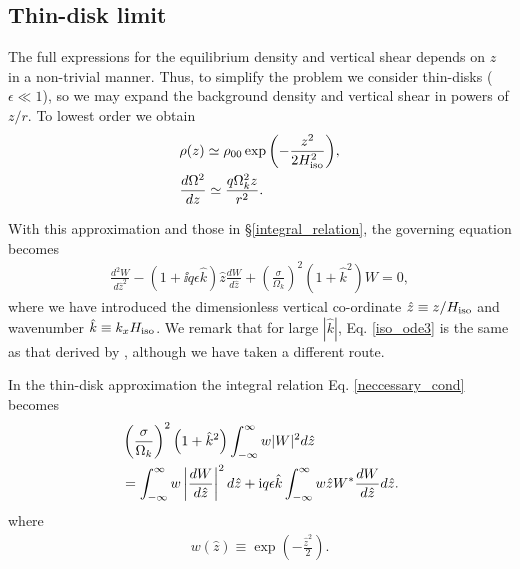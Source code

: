 \subsection{Thin-disk limit}
The full expressions for the equilibrium density and vertical shear
depends on $z$ in a non-trivial manner. Thus, to simplify the problem 
we consider thin-disks ($\epsilon\ll1$), 
so we may expand the background density and vertical shear in powers
of $z/r$. To lowest order we obtain
\begin{align}
  &\rho(z) \simeq \rho_{00} \exp{\left(-\frac{z^2}{2H_\mathrm{iso}^2}\right)},\label{thin_dens}\\
  &\frac{d\Omega^2}{dz} \simeq \frac{q\Omega_k^2z}{r^2}. \label{thin_vshear}
\end{align}


With this approximation and those in \S\ref{integral_relation}, the
governing equation becomes
\begin{align}\label{iso_ode3}
  \frac{d^2W}{d\hat{z}^2} - \left(1 + \ii q\epsilon
    \hat{k}\right)\hat{z}\frac{dW}{d\hat{z}} +
  \left(\frac{\sigma}{\Omega_k}\right)^2\left(1+\hat{k}^2\right)W = 
  0, 
\end{align}
where we have introduced the dimensionless vertical co-ordinate
$\hat{z} \equiv z/H_\mathrm{iso}$ and wavenumber $\hat{k} \equiv k_x H_\mathrm{iso}$. We 
remark that for large $|\hat{k}|$, Eq. \ref{iso_ode3} is the same as
that derived by \cite{nelson13}, although we have taken a different
route.  

In the thin-disk approximation the integral relation
Eq. \ref{neccessary_cond} becomes
\begin{align}\label{integral_relation_thin}
 & \left(\frac{\sigma}{\Omega_k}\right)^2\left(1+\hat{k}^2\right)
  \int_{-\infty}^{\infty}w|W|^2d\hat{z}  \notag\\ 
  & =\int_{-\infty}^{\infty}w\left|\frac{dW}{d\hat{z}}\right|^2d\hat{z}
  +\mathrm{i} q \epsilon
  \hat{k}\int_{-\infty}^{\infty}w\hat{z}W^*\frac{dW}{d\hat{z}}d\hat{z}.    
\end{align}
where 
\begin{align}
  w(\hat{z}) \equiv \exp{\left(-\frac{\hat{z}^2}{2}\right)}.  
\end{align}


